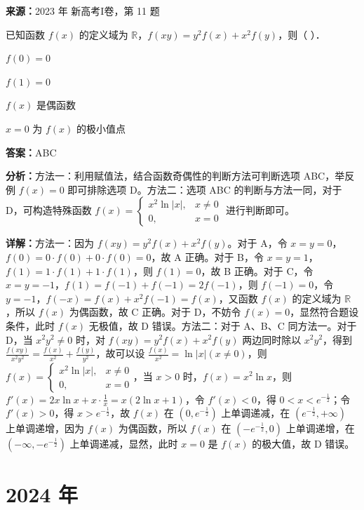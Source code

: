 \begin{question}[points=5]
\textbf{来源：}2023 年 新高考I卷，第 11 题\par
已知函数 $f(x)$ 的定义域为 $\mathbb{R}$，$f(xy)=y^2f(x)+x^2f(y)$，则（ ）．
\begin{choices}
  \item $f(0)=0$
  \item $f(1)=0$
  \item $f(x)$ 是偶函数
  \item $x=0$ 为 $f(x)$ 的极小值点
\end{choices}
\begin{solution}
\textbf{答案：}ABC

\textbf{分析：}方法一：利用赋值法，结合函数奇偶性的判断方法可判断选项 ABC，举反例 $f(x)=0$ 即可排除选项 D。方法二：选项 ABC 的判断与方法一同，对于 D，可构造特殊函数 $f(x)=\begin{cases} x^2\ln|x|, & x\neq 0 \\ 0, & x=0 \end{cases}$ 进行判断即可。

\textbf{详解：}方法一：因为 $f(xy)=y^2f(x)+x^2f(y)$。对于 A，令 $x=y=0$，$f(0)=0\cdot f(0)+0\cdot f(0)=0$，故 A 正确。对于 B，令 $x=y=1$，$f(1)=1\cdot f(1)+1\cdot f(1)$，则 $f(1)=0$，故 B 正确。对于 C，令 $x=y=-1$，$f(1)=f(-1)+f(-1)=2f(-1)$，则 $f(-1)=0$，令 $y=-1$，$f(-x)=f(x)+x^2f(-1)=f(x)$，又函数 $f(x)$ 的定义域为 $\mathbb{R}$，所以 $f(x)$ 为偶函数，故 C 正确。对于 D，不妨令 $f(x)=0$，显然符合题设条件，此时 $f(x)$ 无极值，故 D 错误。方法二：对于 A、B、C 同方法一。对于 D，当 $x^2y^2\neq 0$ 时，对 $f(xy)=y^2f(x)+x^2f(y)$ 两边同时除以 $x^2y^2$，得到 $\frac{f(xy)}{x^2y^2}=\frac{f(x)}{x^2}+\frac{f(y)}{y^2}$，故可以设 $\frac{f(x)}{x^2}=\ln|x|(x\neq 0)$，则 $f(x)=\begin{cases} x^2\ln|x|, & x\neq 0 \\ 0, & x=0 \end{cases}$，当 $x>0$ 时，$f(x)=x^2\ln x$，则 $f'(x)=2x\ln x+x\cdot\frac{1}{x}=x(2\ln x+1)$，令 $f'(x)<0$，得 $0<x<e^{-\frac{1}{2}}$；令 $f'(x)>0$，得 $x>e^{-\frac{1}{2}}$，故 $f(x)$ 在 $(0,e^{-\frac{1}{2}})$ 上单调递减，在 $(e^{-\frac{1}{2}},+\infty)$ 上单调递增，因为 $f(x)$ 为偶函数，所以 $f(x)$ 在 $(-e^{-\frac{1}{2}},0)$ 上单调递增，在 $(-\infty,-e^{-\frac{1}{2}})$ 上单调递减，显然，此时 $x=0$ 是 $f(x)$ 的极大值，故 D 错误。
\end{solution}
\end{question}

\section*{2024 年}

